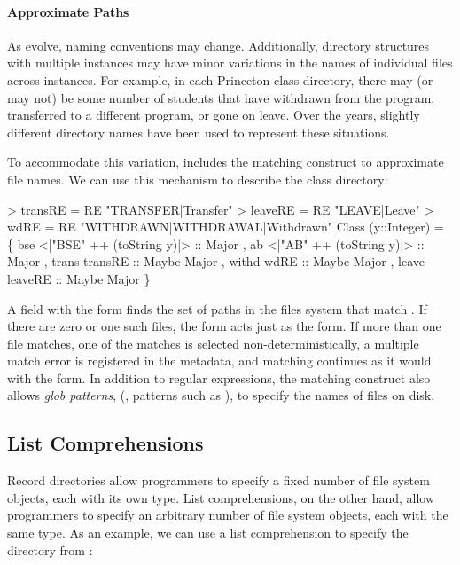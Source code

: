 \paragraph*{Approximate Paths}
As \filestores{} evolve, naming conventions may change.
Additionally, directory structures with multiple instances may have
minor variations in the names of individual files across instances.  
For example, in each Princeton class directory, there may
(or may not) be some number of students that have withdrawn from the
program, transferred to a different program, or gone on
leave.  Over the years, slightly different directory names
have been used to represent these situations.  

To accommodate this variation, \forest{} includes the matching
construct to approximate file names.  We can use this mechanism to
describe the class directory:
\begin{code}
> transRE = RE "TRANSFER|Transfer"
> leaveRE = RE "LEAVE|Leave"
> wdRE    = RE "WITHDRAWN|WITHDRAWAL|Withdrawn"
\mbox{}
 Class (y::Integer) = 
  \{ bse  <|"BSE" ++ (toString y)|> :: Major
  , ab   <|"AB"  ++ (toString y)|> :: Major   
  , trans  transRE :: Maybe Major      
  , withd  wdRE    :: Maybe Major
  , leave  leaveRE :: Maybe Major \}
\end{code}
A field with the form 
finds the set of paths in the files system that match  .
If there are zero or one such files, the  form acts just as the  
form.  If more than one file matches, one of the matches
is selected non-deterministically, a multiple match error is
registered in the metadata, and matching continues as it would with
the  form.  In addition to regular expressions, the matching
construct also allows \textit{glob patterns}, (\ie{}, patterns such as 
),  to specify the names of files on disk. 


\subsection{List Comprehensions}
\label{sec:comprehensions}

Record directories allow programmers to specify a fixed number of file
system objects, each with its own type.
List comprehensions, on the other hand, allow programmers to specify
an arbitrary number of file system objects, each with the same type.
As an example, we can use a list comprehension to specify the
 directory from :

